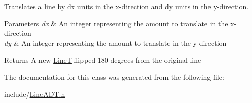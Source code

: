 Translates a line by dx units in the x-\/direction and dy units in the y-\/direction. 


\begin{DoxyParams}{Parameters}
{\em dx} & An integer representing the amount to translate in the x-\/direction \\
\hline
{\em dy} & An integer representing the amount to translate in the y-\/direction \\
\hline
\end{DoxyParams}
\begin{DoxyReturn}{Returns}
A new \mbox{\hyperlink{class_line_t}{LineT}} flipped 180 degrees from the original line 
\end{DoxyReturn}


The documentation for this class was generated from the following file\+:\begin{DoxyCompactItemize}
\item 
include/\mbox{\hyperlink{_line_a_d_t_8h}{Line\+A\+D\+T.\+h}}\end{DoxyCompactItemize}
